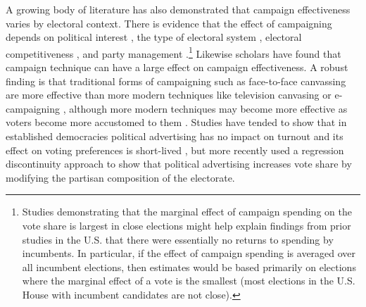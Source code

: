 \documentclass[12pt,final,fleqn]{article}
\theoremstyle{plain}
\begin{document}
A growing body of literature has also demonstrated that campaign effectiveness varies by electoral context. There is evidence that the effect of campaigning depends on political interest \citep{arceneaux2009mobilized, hillygus2005campaign, imai2011estimation, niven2001limits}, the type of electoral system \citep{karp2007getting}, electoral competitiveness \citep{fieldhouse2009effectiveness, gerber2004does}, and party management \citep{fisher2006relative, fisher2011electoral}.\footnote{Studies demonstrating that the marginal effect of campaign spending on the vote share is largest in close elections might help explain findings from prior studies in the U.S. that there were essentially no returns to spending by incumbents. In particular, if the effect of campaign spending is averaged over all incumbent elections, then estimates would be based primarily on elections where the marginal effect of a vote is the smallest (most elections in the U.S. House with incumbent candidates are not close).} Likewise scholars have found that campaign technique can have a large effect on campaign effectiveness. A robust finding is that traditional forms of campaigning such as face-to-face canvassing are more effective than more modern techniques like television canvasing or e-campaigning  \citep{aldrich2016getting, arceneaux2009mobilized, fisher2009evaluating, fisher2016all, gerber2000effects, imai2013estimating, pattie2003hanging}, although more modern techniques may become more effective as voters become more accustomed to them \citep{fisher2009evaluating, imai2005get, fisher2016all}. Studies have tended to show that in established democracies political advertising has no impact on turnout \citep{ashworth2007does, krasno2008televised} and its effect on voting preferences is short-lived \citep{ gerber2011large}, but more recently \citet{spenkuch2018political} used a regression discontinuity approach to show that political advertising increases vote share by modifying the partisan composition of the electorate.
  
\end{document}
